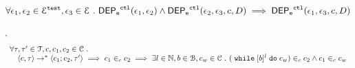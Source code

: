 %
%
\begin{lem}
\label{lem:ctl_trans}
\[
  \forall \mathtt{\epsilon}_1, \mathtt{\epsilon}_2 \in \mathcal{E}^{\mathtt{{test}}}, \mathtt{\epsilon}_3 \in \mathcal{E} ~.~
  \mathsf{DEP_{\mathtt{e}}}^{\mathtt{{ctl}}}(\mathtt{\epsilon}_1, \mathtt{\epsilon}_2) 
  \land \mathsf{DEP_{\mathtt{e}}}^{\mathtt{{ctl}}}(\mathtt{\epsilon}_2, \mathtt{\epsilon}_3, c, D)
  \implies \mathsf{DEP_{\mathtt{e}}}^{\mathtt{{ctl}}}(\mathtt{\epsilon}_1, \mathtt{\epsilon}_3, c, D)
\]
\end{lem}
%
\begin{lem}.
\label{lem:inv_while}
\[
\begin{array}{l}
\forall \mathtt{\tau}, \mathtt{\tau}' \in \mathcal{T}, c, c_1, c_2 \in \mathcal{C} ~.~
	\\ \quad
	\langle c, \mathtt{\tau} \rangle \rightarrow^* \langle c_1; c_2, \mathtt{\tau}' \rangle
	\implies
	c_1 \in_c c_2
	\implies
	\exists l \in \mathbb{N}, b \in \mathcal{B}, c_w \in \mathcal{C} ~.~ 
	(\;\mathtt{while}\; [b]^l \;\mathtt{do}\; c_w) \in_c c_2 \land c_1 \in_c c_w
\end{array}
\]
\end{lem}
%
